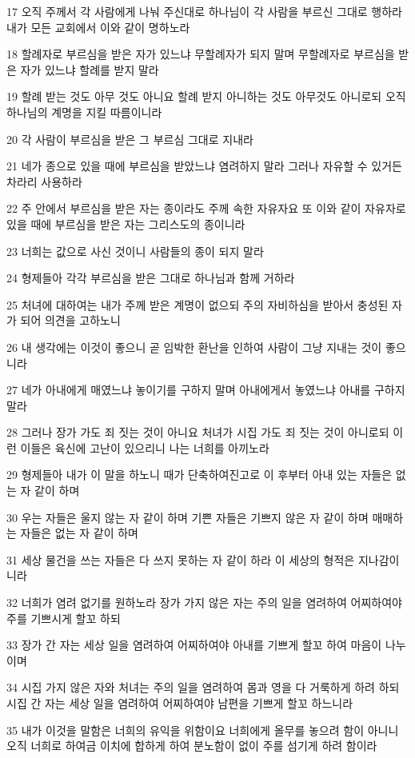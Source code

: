 \par 17 오직 주께서 각 사람에게 나눠 주신대로 하나님이 각 사람을 부르신 그대로 행하라 내가 모든 교회에서 이와 같이 명하노라
\par 18 할례자로 부르심을 받은 자가 있느냐 무할례자가 되지 말며 무할례자로 부르심을 받은 자가 있느냐 할례를 받지 말라
\par 19 할례 받는 것도 아무 것도 아니요 할례 받지 아니하는 것도 아무것도 아니로되 오직 하나님의 계명을 지킬 따름이니라
\par 20 각 사람이 부르심을 받은 그 부르심 그대로 지내라
\par 21 네가 종으로 있을 때에 부르심을 받았느냐 염려하지 말라 그러나 자유할 수 있거든 차라리 사용하라
\par 22 주 안에서 부르심을 받은 자는 종이라도 주께 속한 자유자요 또 이와 같이 자유자로 있을 때에 부르심을 받은 자는 그리스도의 종이니라
\par 23 너희는 값으로 사신 것이니 사람들의 종이 되지 말라
\par 24 형제들아 각각 부르심을 받은 그대로 하나님과 함께 거하라
\par 25 처녀에 대하여는 내가 주께 받은 계명이 없으되 주의 자비하심을 받아서 충성된 자가 되어 의견을 고하노니
\par 26 내 생각에는 이것이 좋으니 곧 임박한 환난을 인하여 사람이 그냥 지내는 것이 좋으니라
\par 27 네가 아내에게 매였느냐 놓이기를 구하지 말며 아내에게서 놓였느냐 아내를 구하지 말라
\par 28 그러나 장가 가도 죄 짓는 것이 아니요 처녀가 시집 가도 죄 짓는 것이 아니로되 이런 이들은 육신에 고난이 있으리니 나는 너희를 아끼노라
\par 29 형제들아 내가 이 말을 하노니 때가 단축하여진고로 이 후부터 아내 있는 자들은 없는 자 같이 하며
\par 30 우는 자들은 울지 않는 자 같이 하며 기쁜 자들은 기쁘지 않은 자 같이 하며 매매하는 자들은 없는 자 같이 하며
\par 31 세상 물건을 쓰는 자들은 다 쓰지 못하는 자 같이 하라 이 세상의 형적은 지나감이니라
\par 32 너희가 염려 없기를 원하노라 장가 가지 않은 자는 주의 일을 염려하여 어찌하여야 주를 기쁘시게 할꼬 하되
\par 33 장가 간 자는 세상 일을 염려하여 어찌하여야 아내를 기쁘게 할꼬 하여 마음이 나누이며
\par 34 시집 가지 않은 자와 처녀는 주의 일을 염려하여 몸과 영을 다 거룩하게 하려 하되 시집 간 자는 세상 일을 염려하여 어찌하여야 남편을 기쁘게 할꼬 하느니라
\par 35 내가 이것을 말함은 너희의 유익을 위함이요 너희에게 올무를 놓으려 함이 아니니 오직 너희로 하여금 이치에 합하게 하여 분노함이 없이 주를 섬기게 하려 함이라
